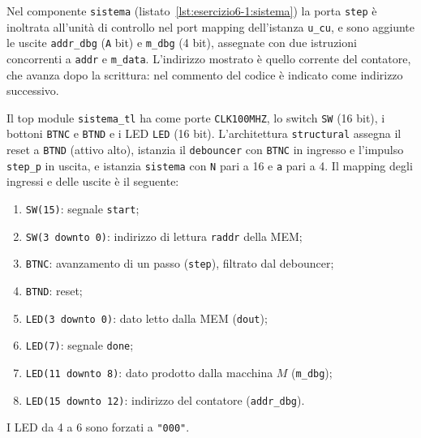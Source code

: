 
Nel componente \texttt{sistema} (listato~\ref{lst:esercizio6-1:sistema}) la porta \texttt{step} è inoltrata all'unità di controllo nel port mapping dell'istanza \texttt{u\_cu}, e sono aggiunte le uscite \texttt{addr\_dbg} (\texttt{A} bit) e \texttt{m\_dbg} (4 bit), assegnate con due istruzioni concorrenti a \texttt{addr} e \texttt{m\_data}. L'indirizzo mostrato è quello corrente del contatore, che avanza dopo la scrittura: nel commento del codice è indicato come indirizzo successivo.



Il top module \texttt{sistema\_tl} ha come porte \texttt{CLK100MHZ}, lo switch \texttt{SW} (16 bit), i bottoni \texttt{BTNC} e \texttt{BTND} e i LED \texttt{LED} (16 bit). L'architettura \texttt{structural} assegna il reset a \texttt{BTND} (attivo alto), istanzia il \texttt{debouncer} con \texttt{BTNC} in ingresso e l'impulso \texttt{step\_p} in uscita, e istanzia \texttt{sistema} con \texttt{N} pari a 16 e \texttt{a} pari a 4. Il mapping degli ingressi e delle uscite è il seguente:
\begin{enumerate}
  \item \texttt{SW(15)}: segnale \texttt{start};
  \item \texttt{SW(3 downto 0)}: indirizzo di lettura \texttt{raddr} della MEM;
  \item \texttt{BTNC}: avanzamento di un passo (\texttt{step}), filtrato dal debouncer;
  \item \texttt{BTND}: reset;
  \item \texttt{LED(3 downto 0)}: dato letto dalla MEM (\texttt{dout});
  \item \texttt{LED(7)}: segnale \texttt{done};
  \item \texttt{LED(11 downto 8)}: dato prodotto dalla macchina $M$ (\texttt{m\_dbg});
  \item \texttt{LED(15 downto 12)}: indirizzo del contatore (\texttt{addr\_dbg}).
\end{enumerate}
I LED da 4 a 6 sono forzati a \texttt{"000"}.

